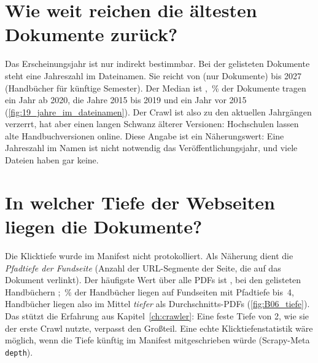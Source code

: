 \section{Wie weit reichen die ältesten Dokumente zurück?}
Das Erscheinungsjahr ist nur indirekt bestimmbar. Bei \zJahrAnzahl{} der gelisteten Dokumente steht eine Jahreszahl im Dateinamen. Sie reicht von \zJahrMin{} (nur \zJahrMinAnzahl{} Dokumente) bis 2027 (Handbücher für künftige Semester). Der Median ist \zJahrMedian, \zJahrAnteilNeu\,\% der Dokumente tragen ein Jahr ab 2020, \zJahreMitte{} die Jahre 2015 bis 2019 und \zJahreAlt{} ein Jahr vor 2015 (\cref{fig:19_jahre_im_dateinamen}). Der Crawl ist also zu den aktuellen Jahrgängen verzerrt, hat aber einen langen Schwanz älterer Versionen: Hochschulen lassen alte Handbuchversionen online. Diese Angabe ist ein Näherungswert: Eine Jahreszahl im Namen ist nicht notwendig das Veröffentlichungsjahr, und viele Dateien haben gar keine.


\section{In welcher Tiefe der Webseiten liegen die Dokumente?}
Die Klicktiefe wurde im Manifest nicht protokolliert. Als Näherung dient die \emph{Pfadtiefe der Fundseite} (Anzahl der URL-Segmente der Seite, die auf das Dokument verlinkt). Der häufigste Wert über alle PDFs ist \zTiefeModusAlle, bei den gelisteten Handbüchern \zTiefeModusMH; \zTiefeMHBisVier\,\% der Handbücher liegen auf Fundseiten mit Pfadtiefe bis~4, Handbücher liegen also im Mittel \emph{tiefer} als Durchschnitts-PDFs (\cref{fig:B06_tiefe}). Das stützt die Erfahrung aus Kapitel~\ref{ch:crawler}: Eine feste Tiefe von 2, wie sie der erste Crawl nutzte, verpasst den Großteil. Eine echte Klicktiefenstatistik wäre möglich, wenn die Tiefe künftig im Manifest mitgeschrieben würde (Scrapy-Meta \texttt{depth}).


